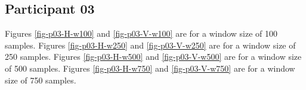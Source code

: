 \documentclass[12pt]{article}
\begin{document}


\newpage
\subsection{Participant 03}
Figures \ref{fig-p03-H-w100} and \ref{fig-p03-V-w100} are for a window size of 100 samples.
Figures \ref{fig-p03-H-w250} and \ref{fig-p03-V-w250} are for a window size of 250 samples.
Figures \ref{fig-p03-H-w500} and \ref{fig-p03-V-w500} are for a window size of 500 samples.
Figures \ref{fig-p03-H-w750} and \ref{fig-p03-V-w750} are for a window size of 750 samples.
\end{document}
